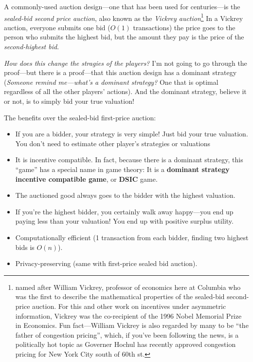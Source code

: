 \documentclass[11pt]{article}
\begin{document}
A commonly-used auction design---one that has been used for centuries---is the {\it sealed-bid second price auction}, also known as the {\it Vickrey auction}\footnote{named after William Vickrey, professor of economics here at Columbia who was the first to describe the mathematical properties of the sealed-bid second-price auction. For this and other work on incentives under asymmetric information, Vickrey was the co-recipient of the 1996 Nobel Memorial Prize in Economics. Fun fact---William Vickrey is also regarded by many to be ``the father of congestion pricing'', which, if you've been following the news, is a politically hot topic as Governer Hochul has recently approved congestion pricing for New York City south of 60th st. }
In a Vickrey auction, everyone submits one bid ($O(1)$ transactions) the price goes to the person who submits the highest bid, but the amount they pay is the price of the {\it second-highest bid}.

{\it How does this change the stragies of the players?} I'm not going to go through the proof---but there is a proof---that this auction design has a dominant strategy ({\it Someone remind me---what's a dominant strategy?} One that is optimal regardless of all the other players' actions). And the dominant strategy, believe it or not, is to simply bid your true valuation! 

The benefits over the sealed-bid first-price auction:
\begin{itemize}
    \item If you are a bidder, your strategy is very simple! Just bid your true valuation. You don't need to estimate other player's strategies or valuations
    \item It is incentive compatible. In fact, because there is a dominant strategy, this ``game'' has a special name in game theory: It is a {\bf dominant strategy incentive compatible game}, or {\bf DSIC} game. 
    \item The auctioned good always goes to the bidder with the highest valuation.
    \item If you're the highest bidder, you certainly walk away happy---you end up paying less than your valuation! You end up with positive surplus utility. 
    \item Computationally efficient (1 transaction from each bidder, finding two highest bids is $O(n)$).
    \item Privacy-preserving (same with first-price sealed bid auction).
\end{itemize}
\end{document}
